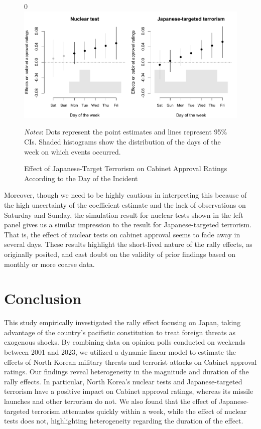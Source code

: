 \documentclass[letterpaper,12pt]{scrartcl}
\newcommand{\counting}{0}
\begin{document}
\begin{figure}[!t]
\begin{minipage}{\hsize}
\centering
\singlespacing
\if\counting0
\includegraphics[scale=1]{Figure_JCR/effect_on_cabinet_approval_by_day.pdf}
\fi
\caption{Effect of Japanese-Target Terrorism on Cabinet Approval Ratings According to the Day of the Incident}
\label{effect_on_cabinet_approval_by_day}
\end{minipage}
\begin{minipage}{\hsize}
\singlespacing
\small
\emph{Notes}: Dots represent the point estimates and lines represent 95\% CIs. Shaded histograms show the distribution of the days of the week on which events occurred.
\bigskip
\end{minipage}
\end{figure}

Moreover, though we need to be highly cautious in interpreting this because of the high uncertainty of the coefficient estimate and the lack of observations on Saturday and Sunday, the simulation result for nuclear tests shown in the left panel gives us a similar impression to the result for Japanese-targeted terrorism. That is, the effect of nuclear tests on cabinet approval seems to fade away in several days. These results highlight the short-lived nature of the rally effects, as \citet{Mueller1970APSR} originally posited, and cast doubt on the validity of prior findings based on monthly or more coarse data.

\section*{Conclusion\centering}

This study empirically investigated the rally effect focusing on Japan, taking advantage of the country's pacifistic constitution to treat foreign threats as exogenous shocks. By combining data on opinion polls conducted on weekends between 2001 and 2023, we utilized a dynamic linear model to estimate the effects of North Korean military threats and terrorist attacks on Cabinet approval ratings. Our findings reveal heterogeneity in the magnitude and duration of the rally effects. In particular, North Korea's nuclear tests and Japanese-targeted terrorism have a positive impact on Cabinet approval ratings, whereas its missile launches and other terrorism do not. We also found that the effect of Japanese-targeted terrorism attenuates quickly within a week, while the effect of nuclear tests does not, highlighting heterogeneity regarding the duration of the effect.
\end{document}
